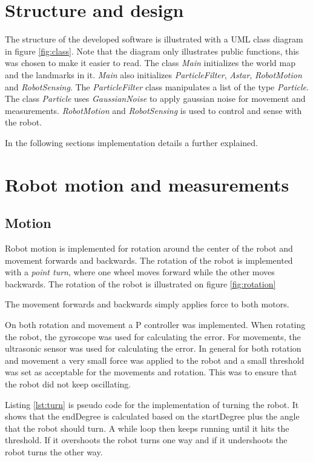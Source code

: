 \section{Structure and design}
The structure of the developed software is illustrated with a UML class diagram in figure \ref{fig:class}. Note that the diagram only illustrates public functions, this was chosen to make it easier to read. The class \emph{Main} initializes the world map and the landmarks in it. \emph{Main} also initializes \emph{ParticleFilter}, \emph{Astar}, \emph{RobotMotion} and \emph{RobotSensing}. The \emph{ParticleFilter} class manipulates a list of the type \emph{Particle}. The class \emph{Particle} uses \emph{GaussianNoise} to apply gaussian noise for movement and measurements. \emph{RobotMotion} and \emph{RobotSensing} is used to control and sense with the robot.


In the following sections implementation details a further explained.

\section{Robot motion and measurements}
\subsection{Motion}
Robot motion is implemented for rotation around the center of the robot and movement forwards and backwards. The rotation of the robot is implemented with a \emph{point turn}, where one wheel moves forward while the other moves backwards. The rotation of the robot is illustrated on figure \ref{fig:rotation}



The movement forwards and backwards simply applies force to both motors. 

On both rotation and movement a P controller was implemented. When rotating the robot, the gyroscope was used for calculating the error. For movements, the ultrasonic sensor was used for calculating the error. In general for both rotation and movement a very small force was applied to the robot and a small threshold was set as acceptable for the movements and rotation. This was to ensure that the robot did not keep oscillating.

Listing \ref{lst:turn} is pseudo code for the implementation of turning the robot. It shows that the endDegree is calculated based on the startDegree plus the angle that the robot should turn. A while loop then keeps running until it hits the threshold. If it overshoots the robot turns one way and if it undershoots the robot turns the other way.

